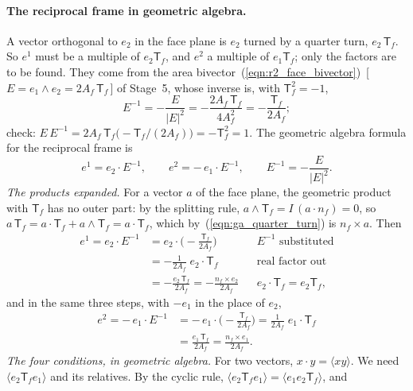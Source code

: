 \paragraph{The reciprocal frame in geometric algebra.} A vector orthogonal to $e_2$ in the face plane is $e_2$ turned by a quarter turn, $e_2\,\mathsf T_f$. So $e^1$ must be a multiple of $e_2\mathsf T_f$, and $e^2$ a multiple of $e_1\mathsf T_f$; only the factors are to be found. They come from the area bivector~(\ref{eqn:r2_face_bivector})~[\,$E = e_1\wedge e_2 = 2A_f\,\mathsf T_f$\,] of Stage~5, whose inverse is, with $\mathsf T_f^2 = -1$,
\begin{equation*}
E^{-1} = -\frac{E}{|E|^2} = -\frac{2A_f\,\mathsf T_f}{4A_f^2} = -\frac{\mathsf T_f}{2A_f} ;
\end{equation*}
check: $E\,E^{-1} = 2A_f\,\mathsf T_f\big(-\mathsf T_f/(2A_f)\big) = -\mathsf T_f^2 = 1$.
The geometric algebra formula for the reciprocal frame is
\begin{equation}
\label{eqn:ga_reciprocal}
e^1 = e_2 \cdot E^{-1}, \qquad e^2 = -\,e_1 \cdot E^{-1}, \qquad E^{-1} = -\frac{E}{|E|^2} .
\end{equation}
\emph{The products expanded.} For a vector $a$ of the face plane, the geometric product with $\mathsf T_f$ has no outer part: by the splitting rule, $a\wedge\mathsf T_f = I\,(a\cdot n_f) = 0$, so $a\,\mathsf T_f = a\cdot\mathsf T_f + a\wedge\mathsf T_f = a\cdot\mathsf T_f$, which by~(\ref{eqn:ga_quarter_turn}) is $n_f\times a$. Then
\begin{align*}
e^1 = e_2\cdot E^{-1} &= e_2\cdot\Big(-\frac{\mathsf T_f}{2A_f}\Big) && E^{-1} \text{ substituted} \\
&= -\frac{1}{2A_f}\; e_2\cdot\mathsf T_f && \text{real factor out} \\
&= -\frac{e_2\,\mathsf T_f}{2A_f} = -\frac{n_f\times e_2}{2A_f} && e_2\cdot\mathsf T_f = e_2\mathsf T_f ,
\end{align*}
and in the same three steps, with $-e_1$ in the place of $e_2$,
\begin{align*}
e^2 = -\,e_1\cdot E^{-1} &= -\,e_1\cdot\Big(-\frac{\mathsf T_f}{2A_f}\Big) = \frac{1}{2A_f}\; e_1\cdot\mathsf T_f \\
&= \frac{e_1\,\mathsf T_f}{2A_f} = \frac{n_f\times e_1}{2A_f} .
\end{align*}
\emph{The four conditions, in geometric algebra.} For two vectors, $x\cdot y = \langle xy\rangle$. We need $\langle e_2\mathsf T_f e_1\rangle$ and its relatives. By the cyclic rule, $\langle e_2\mathsf T_f e_1\rangle = \langle e_1 e_2\mathsf T_f\rangle$, and
